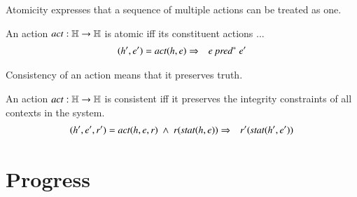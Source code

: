 \documentclass{elsarticle}
\def\id#1{\text{\em #1\/}}
\begin{document}
	Atomicity expresses that a sequence of multiple actions can be treated as one.
\begin{definition}[Atomicity]
\item An action $\id{act}:\mathbb H\rightarrow\mathbb H$ is atomic iff its constituent actions ...
\label{def:Atomicity}
\begin{eqnarray}
	(h',e')=\id{act}(h,e)&\Rightarrow&e\ \id{pred}^*\ e'
\end{eqnarray}
\end{definition}

	Consistency of an action means that it preserves truth.
\begin{definition}[Consistency]
\item An action $\id{act}:\mathbb H\rightarrow\mathbb H$ is consistent iff it preserves the integrity constraints of all contexts in the system.
\label{def:Consistency}
\begin{eqnarray}
	(h',e',r')=\id{act}(h,e,r)\ \wedge\ r(\id{stat}(h,e))&\Rightarrow&r'(\id{stat}(h',e'))
\end{eqnarray}
\end{definition}

\section{Progress}
\label{sct:Progress}
\end{document}
